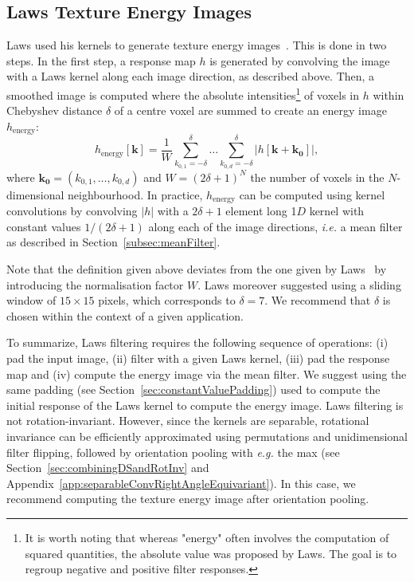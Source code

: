 \documentclass[fleqn,a4paper,oneside,openany]{book}
\begin{document}
\subsection{Laws Texture Energy Images}
%
Laws used his kernels to generate texture energy images~\cite{Law1980}. This is done in two steps. In the first step, a response map $h$ is generated by convolving the image with a Laws kernel along each image direction, as described above. Then, a smoothed image is computed where the absolute intensities\footnote{It is worth noting that whereas "energy" often involves the computation of squared quantities, the absolute value was proposed by Laws. The goal is to regroup negative and positive filter responses.} of voxels in $h$ within Chebyshev distance $\delta$ of a centre voxel are summed to create an energy image $h_{\text{energy}}$:
$$h_{\text{energy}}[\boldsymbol{k}]=\frac{1}{W}\sum_{k_{0,1}=-\delta}^{\delta}
\dots
\sum_{k_{0,d}=-\delta}^{\delta}\left|h[\boldsymbol{k}+\boldsymbol{k_0}]\right|,$$
where $\boldsymbol{k_0}=(k_{0,1},\dots,k_{0,d})$ and $W=\left(2\delta+1\right)^N$ the number of voxels in the $N$-dimensional neighbourhood.
In practice, \(h_{\text{energy}}\) can be computed using kernel convolutions by convolving $|h|$ with a $2\delta+1$ element long 1$D$ kernel with constant values $1/\left(2\delta+1\right)$ along each of the image directions, \textit{i.e.} a mean filter as described in Section~\ref{subsec:meanFilter}.

Note that the definition given above deviates from the one given by Laws~\cite{Law1980} by introducing the normalisation factor \(W\).
Laws moreover suggested using a sliding window of $15\times 15$ pixels, which corresponds to $\delta=7$.
We recommend that $\delta$ is chosen within the context of a given application.

To summarize, Laws filtering requires the following sequence of operations: (i) pad the input image, (ii) filter with a given Laws kernel, (iii) pad the response map and (iv) compute the energy image via the mean filter.
We suggest using the same padding (see Section~\ref{sec:constantValuePadding}) used to compute the initial response of the Laws kernel to compute the energy image.
Laws filtering is not rotation-invariant.
However, since the kernels are separable, rotational invariance can be efficiently approximated using permutations and unidimensional filter flipping, followed by orientation pooling with \textit{e.g.} the max (see Section~\ref{sec:combiningDSandRotInv} and Appendix~\ref{app:separableConvRightAngleEquivariant}).
In this case, we recommend computing the texture energy image after orientation pooling.
\end{document}
